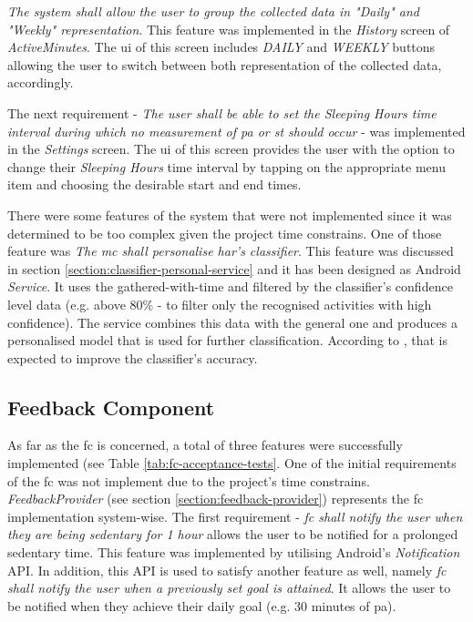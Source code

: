 \textit{The system shall allow the user to group the collected data in "Daily" and "Weekly" representation}. This feature was implemented in the \textit{History} screen of \textit{ActiveMinutes}. The \gls{ui} of this screen includes \textit{DAILY} and \textit{WEEKLY} buttons allowing the user to switch between both representation of the collected data, accordingly.

The next requirement - \textit{The user shall be able to set the \textit{Sleeping Hours} time interval during which no measurement of \gls{pa} or \gls{st} should occur} - was implemented in the \textit{Settings} screen. The \gls{ui} of this screen provides the user with the option to change their \textit{Sleeping Hours} time interval by tapping on the appropriate menu item and choosing the desirable start and end times.

There were some features of the system that were not implemented since it was determined to be too complex given the project time constrains. One of those feature was \textit{The \gls{mc} shall personalise \gls{har}'s classifier}. This feature was discussed in section \ref{section:classifier-personal-service} and it has been designed as Android \textit{Service}. It uses the gathered-with-time and filtered by the classifier's confidence level data (e.g. above 80\% - to filter only the recognised activities with high confidence). The service combines this data with the general one and produces a personalised model that is used for further classification. According to \citet[376]{arapakis_athanasakos_jose_2010}, that is expected to improve the classifier's accuracy.


\subsection{Feedback Component}
As far as the \gls{fc} is concerned, a total of three features were successfully implemented (see Table \ref{tab:fc-acceptance-tests}. One of the initial requirements of the \gls{fc} was not implement due to the project's time constrains. \textit{FeedbackProvider} (see section \ref{section:feedback-provider}) represents the \gls{fc} implementation system-wise. The first requirement - \textit{\gls{fc} shall notify the user when they are being sedentary for 1 hour} allows the user to be notified for a prolonged sedentary time. This feature was implemented by utilising Android's \textit{Notification} API. In addition, this API is used to satisfy another feature as well, namely \textit{\gls{fc} shall notify the user when a previously set goal is attained}. It allows the user to be notified when they achieve their daily goal (e.g. 30 minutes of \gls{pa}).

